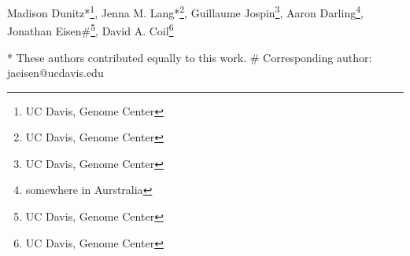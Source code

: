Madison Dunitz*\footnote{UC Davis, Genome Center}, Jenna M. Lang*\footnote{UC Davis, Genome Center}, Guillaume Jospin\footnote{UC Davis, Genome Center}, Aaron Darling\footnote{somewhere in Aurstralia}, Jonathan Eisen\#\footnote{UC Davis, Genome Center}, David A. Coil\footnote{UC Davis, Genome Center} 

* These authors contributed equally to this work.
\# Corresponding author: jaeisen@ucdavis.edu